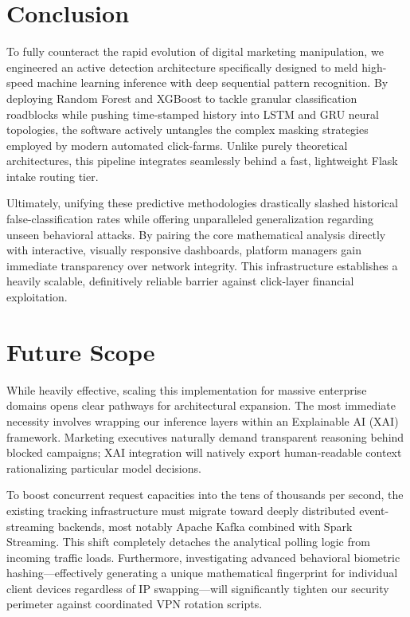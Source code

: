 \documentclass[conference]{IEEEtran}
\begin{document}
\section{Conclusion}
To fully counteract the rapid evolution of digital marketing manipulation, we engineered an active detection architecture specifically designed to meld high-speed machine learning inference with deep sequential pattern recognition. By deploying Random Forest and XGBoost to tackle granular classification roadblocks while pushing time-stamped history into LSTM and GRU neural topologies, the software actively untangles the complex masking strategies employed by modern automated click-farms. Unlike purely theoretical architectures, this pipeline integrates seamlessly behind a fast, lightweight Flask intake routing tier. 

Ultimately, unifying these predictive methodologies drastically slashed historical false-classification rates while offering unparalleled generalization regarding unseen behavioral attacks. By pairing the core mathematical analysis directly with interactive, visually responsive dashboards, platform managers gain immediate transparency over network integrity. This infrastructure establishes a heavily scalable, definitively reliable barrier against click-layer financial exploitation.

\section{Future Scope}
While heavily effective, scaling this implementation for massive enterprise domains opens clear pathways for architectural expansion. The most immediate necessity involves wrapping our inference layers within an Explainable AI (XAI) framework. Marketing executives naturally demand transparent reasoning behind blocked campaigns; XAI integration will natively export human-readable context rationalizing particular model decisions. 

To boost concurrent request capacities into the tens of thousands per second, the existing tracking infrastructure must migrate toward deeply distributed event-streaming backends, most notably Apache Kafka combined with Spark Streaming. This shift completely detaches the analytical polling logic from incoming traffic loads. Furthermore, investigating advanced behavioral biometric hashing—effectively generating a unique mathematical fingerprint for individual client devices regardless of IP swapping—will significantly tighten our security perimeter against coordinated VPN rotation scripts.
\end{document}
